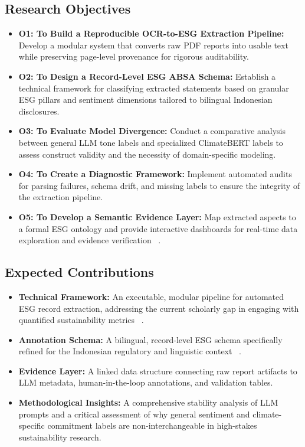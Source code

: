 \documentclass[english, online, cse, master]{dithesis}
\begin{document}
\subsection{Research Objectives}
\begin{itemize}
\item 

\textbf{O1: To Build a Reproducible OCR-to-ESG Extraction Pipeline:} Develop a modular system that converts raw PDF reports into usable text while preserving page-level provenance for rigorous auditability.\item 

\textbf{O2: To Design a Record-Level ESG ABSA Schema:} Establish a technical framework for classifying extracted statements based on granular ESG pillars and sentiment dimensions tailored to bilingual Indonesian disclosures.\item 

\textbf{O3: To Evaluate Model Divergence:} Conduct a comparative analysis between general LLM tone labels and specialized ClimateBERT labels to assess construct validity and the necessity of domain-specific modeling.\item 

\textbf{O4: To Create a Diagnostic Framework:} Implement automated audits for parsing failures, schema drift, and missing labels to ensure the integrity of the extraction pipeline.\item 

\textbf{O5: To Develop a Semantic Evidence Layer:} Map extracted aspects to a formal ESG ontology and provide interactive dashboards for real-time data exploration and evidence verification  ~\cite{ahmad_zaki_49372c30}.
\end{itemize}
\subsection{Expected Contributions}
\begin{itemize}
\item 

\textbf{Technical Framework:} An executable, modular pipeline for automated ESG record extraction, addressing the current scholarly gap in engaging with quantified sustainability metrics  ~\cite{ahmad_zaki_49372c30}.\item 

\textbf{Annotation Schema:} A bilingual, record-level ESG schema specifically refined for the Indonesian regulatory and linguistic context  ~\cite{desi_adhariani_toit_543335d6}.\item 

\textbf{Evidence Layer:} A linked data structure connecting raw report artifacts to LLM metadata, human-in-the-loop annotations, and validation tables.\item 

\textbf{Methodological Insights:} A comprehensive stability analysis of LLM prompts and a critical assessment of why general sentiment and climate-specific commitment labels are non-interchangeable in high-stakes sustainability research.
\end{itemize}
\end{document}
